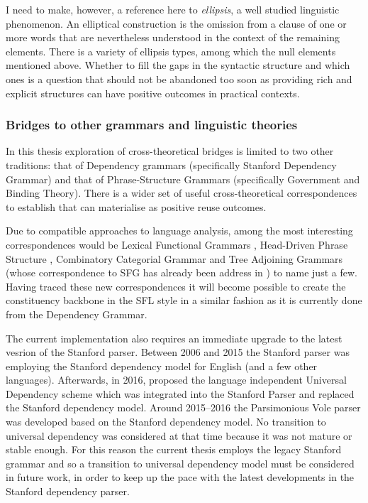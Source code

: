     I need to make, however, a reference here to \textit{ellipsis}, a well studied linguistic phenomenon. An elliptical construction is the omission from a clause of one or more words that are nevertheless understood in the context of the remaining elements. There is a variety of ellipsis types, among which the null elements mentioned above. Whether to fill the gaps in the syntactic structure and which ones is a question that should not be abandoned too soon as providing rich and explicit structures can have positive outcomes in practical contexts. 

\subsubsection{Bridges to other grammars and linguistic theories}

    In this thesis exploration of cross-theoretical bridges is limited to two other traditions: that of Dependency grammars (specifically Stanford Dependency Grammar) and that of Phrase-Structure Grammars (specifically Government and Binding Theory). There is a wider set of useful cross-theoretical correspondences to establish that can materialise as positive reuse outcomes. 
    
    Due to compatible approaches to language analysis, among the most interesting correspondences would be Lexical Functional Grammars \citep{bresnan2015lexical}, Head-Driven Phrase Structure \citep{PollardSag1994}, Combinatory Categorial Grammar \citep{Steedman93,Steedman2000} and Tree Adjoining Grammars \citep{KrochJoshi85} (whose correspondence to SFG has already been address in \citet{Yang-etal91}) to name just a few. Having traced these new correspondences it will become possible to create the constituency backbone in the SFL style in a similar fashion as it is currently done from the Dependency Grammar. 
    
    The current implementation also requires an immediate upgrade to the latest vesrion of the Stanford parser. Between 2006 and 2015 the Stanford parser \citep{Marneffe2006} was employing the Stanford dependency model for English (and a few other languages). Afterwards, in 2016, \citet{Nivre2016ud} proposed the language independent Universal Dependency scheme which was integrated into the Stanford Parser and replaced the Stanford dependency model. Around 2015--2016 the Parsimonious Vole parser was developed based on the Stanford dependency model. No transition to universal dependency was considered at that time because it was not mature or stable enough. For this reason the current thesis employs the legacy Stanford grammar and so a transition to universal dependency model must be considered in future work, in order to keep up the pace with the latest developments in the Stanford dependency parser. 
    
